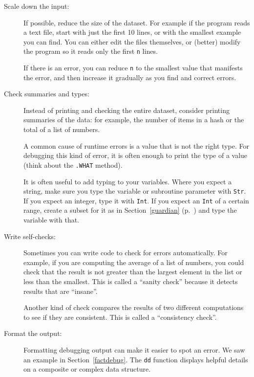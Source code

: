 \begin{description}

\item[Scale down the input:] If possible, reduce the size of the
dataset.  For example if the program reads a text file, start with
just the first 10 lines, or with the smallest example you can find.
You can either edit the files themselves, or (better) modify the
program so it reads only the first {\tt n} lines.

If there is an error, you can reduce {\tt n} to the smallest
value that manifests the error, and then increase it gradually
as you find and correct errors.

\item[Check summaries and types:] Instead of printing and checking the
entire dataset, consider printing summaries of the data: for example,
the number of items in a hash or the total of a list of numbers.

A common cause of runtime errors is a value that is not the right
type.  For debugging this kind of error, it is often enough to print
the type of a value (think about the {\tt .WHAT} method).

It is often useful to add typing to your variables. Where you 
expect a string, make sure you type the variable or subroutine 
parameter with {\tt Str}. If you expect an integer, type it with 
{\tt Int}. If you expect an {\tt Int} of a certain range, create 
a subset for it as in Section~\ref{guardian} (p.~\pageref{guardian}) 
and type the variable with that.

\item[Write self-checks:]  Sometimes you can write code to check
for errors automatically.  For example, if you are computing the
average of a list of numbers, you could check that the result is
not greater than the largest element in the list or less than
the smallest.  This is called a ``sanity check'' because it detects
results that are ``insane''.

Another kind of check compares the results of two different
computations to see if they are consistent.  This is called a
``consistency check''.

\item[Format the output:] Formatting debugging output
can make it easier to spot an error.  We saw an example in
Section~\ref{factdebug}.  The {\tt dd} function displays 
helpful details on a composite or complex data structure.


\end{description}

